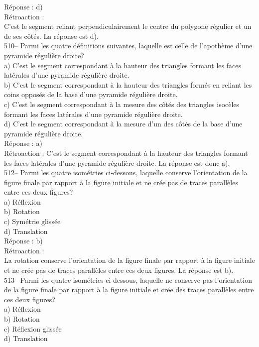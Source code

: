 ﻿\documentclass[letterpaper, 12pt]{article}
\begin{document}
R\'eponse : d)\\

R\'etroaction :  \\
C'est le segment reliant perpendiculairement le centre du polygone
r\'egulier et un de ses c\^ot\'es.  La r\'eponse est d).\\

510-- Parmi les quatre d\'efinitions suivantes, laquelle est celle de
l'apoth\`eme d'une pyramide r\'eguli\`ere droite?\\
a) C'est le segment correspondant \`a la hauteur des triangles formant les
faces lat\'erales d'une pyramide r\'eguli\`ere droite.  \\
b) C'est le segment correspondant \`a la hauteur des triangles form\'es en
reliant les coins oppos\'es de la base d'une pyramide r\'eguli\`ere
droite.\\
c) C'est le segment correspondant \`a la mesure des c\^ot\'es des triangles
isoc\`eles formant les faces lat\'erales d'une pyramide r\'eguli\`ere
droite.\\
d) C'est le segment correspondant \`a la mesure d'un des c\^ot\'es de la
base d'une pyramide r\'eguli\`ere droite.\\

R\'eponse : a)\\

R\'etroaction :
C'est le segment correspondant \`a la hauteur des triangles formant les
faces lat\'erales d'une pyramide r\'eguli\`ere droite.  La r\'eponse est
donc a).\\


512--  Parmi les quatre isom\'etries ci-dessous, laquelle conserve
l'orientation de la figure finale par rapport \`a la figure initiale et ne
cr\'ee pas de traces parall\`eles entre ces deux figures?\\
a) R\'eflexion\\
b) Rotation\\
c) Sym\'etrie gliss\'ee\\
d) Translation\\

R\'eponse : b)\\

R\'etroaction :\\
La rotation conserve l'orientation de la figure finale par rapport \`a la
figure initiale et ne cr\'ee pas de traces parall\`eles entre ces deux
figures. La r\'eponse est b).\\

513--  Parmi les quatre isom\'etries ci-dessous, laquelle ne conserve pas
l'orientation de la figure finale par rapport \`a la figure initiale et
cr\'ee des traces parall\`eles entre ces deux figures?\\
a) R\'eflexion\\
b) Rotation\\
c) R\'eflexion gliss\'ee\\
d) Translation\\
\end{document}
